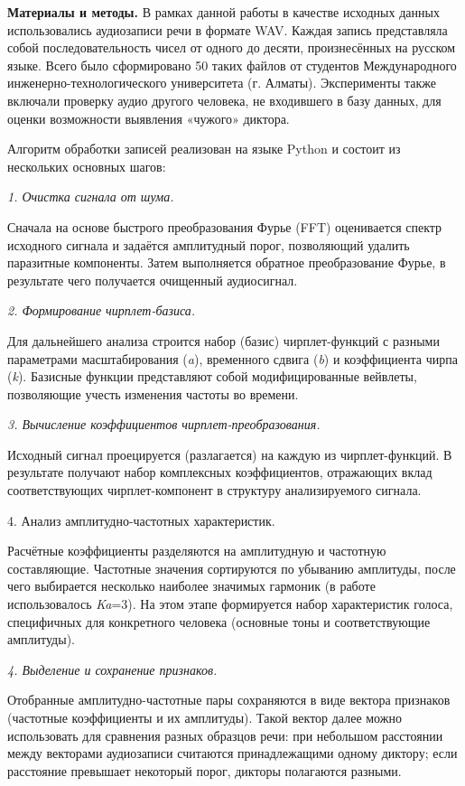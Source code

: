 \begin{multicols}{2}
{\bfseries Материалы и методы.} В рамках данной работы в качестве исходных
данных использовались аудиозаписи речи в формате WAV. Каждая запись
представляла собой последовательность чисел от одного до десяти,
произнесённых на русском языке. Всего было сформировано 50 таких файлов
от студентов Международного инженерно-технологического университета (г.
Алматы). Эксперименты также включали проверку аудио другого человека, не
входившего в базу данных, для оценки возможности выявления «чужого»
диктора.

Алгоритм обработки записей реализован на языке Python и состоит из
нескольких основных шагов:

\emph{1. Очистка сигнала от шума.}

Сначала на основе быстрого преобразования Фурье (FFT) оценивается спектр
исходного сигнала и задаётся амплитудный порог, позволяющий удалить
паразитные компоненты. Затем выполняется обратное преобразование Фурье,
в результате чего получается очищенный аудиосигнал.

\emph{2. Формирование чирплет-базиса.}

Для дальнейшего анализа строится набор (базис) чирплет-функций с разными
параметрами масштабирования (\emph{a}), временного сдвига (\emph{b}) и
коэффициента чирпа (\emph{k}). Базисные функции представляют собой
модифицированные вейвлеты, позволяющие учесть изменения частоты во
времени.

\emph{3. Вычисление коэффициентов чирплет-преобразования.}

Исходный сигнал проецируется (разлагается) на каждую из чирплет-функций.
В результате получают набор комплексных коэффициентов, отражающих вклад
соответствующих чирплет-компонент в структуру анализируемого сигнала.

4. Анализ амплитудно-частотных характеристик.

Расчётные коэффициенты разделяются на амплитудную и частотную
составляющие. Частотные значения сортируются по убыванию амплитуды,
после чего выбирается несколько наиболее значимых гармоник (в работе
использовалось \emph{Ka}=3). На этом этапе формируется набор
характеристик голоса, специфичных для конкретного человека (основные
тоны и соответствующие амплитуды).

\emph{4. Выделение и сохранение признаков.}

Отобранные амплитудно-частотные пары сохраняются в виде вектора
признаков (частотные коэффициенты и их амплитуды). Такой вектор далее
можно использовать для сравнения разных образцов речи: при небольшом
расстоянии между векторами аудиозаписи считаются принадлежащими одному
диктору; если расстояние превышает некоторый порог, дикторы полагаются
разными.


\end{multicols}
